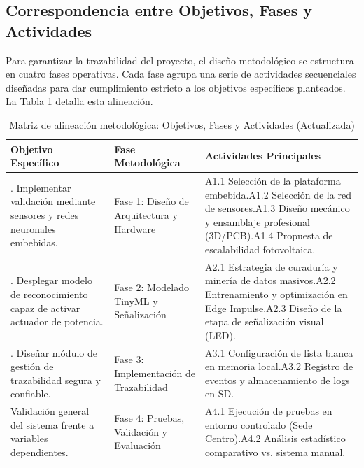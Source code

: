 \documentclass[12pt, letterpaper]{article}
\begin{document}
\subsection{Correspondencia entre Objetivos, Fases y Actividades}
Para garantizar la trazabilidad del proyecto, el diseño metodológico se estructura en cuatro fases operativas. Cada fase agrupa una serie de actividades secuenciales diseñadas para dar cumplimiento estricto a los objetivos específicos planteados. La Tabla \ref{tab:metodologia} detalla esta alineación.

\begin{table}[!ht]
\centering
\caption{Matriz de alineación metodológica: Objetivos, Fases y Actividades (Actualizada)}
\label{tab:metodologia}
\renewcommand{\arraystretch}{1.5}
\begin{tabularx}{\columnwidth}{>{\raggedright\arraybackslash}p{} >{\raggedright\arraybackslash}p{} X}
\toprule
\textbf{Objetivo Específico} & \textbf{Fase Metodológica} & \textbf{Actividades Principales} \\
\midrule
1. Implementar validación mediante sensores y redes neuronales embebidas. & Fase 1: Diseño de Arquitectura y Hardware & A1.1 Selección de la plataforma embebida.\newline A1.2 Selección de la red de sensores.\newline A1.3 Diseño mecánico y ensamblaje profesional (3D/PCB).\newline A1.4 Propuesta de escalabilidad fotovoltaica. \\
\midrule
2. Desplegar modelo de reconocimiento capaz de activar actuador de potencia. & Fase 2: Modelado TinyML y Señalización & A2.1 Estrategia de curaduría y minería de datos masivos.\newline A2.2 Entrenamiento y optimización en Edge Impulse.\newline A2.3 Diseño de la etapa de señalización visual (LED). \\
\midrule
3. Diseñar módulo de gestión de trazabilidad segura y confiable. & Fase 3: Implementación de Trazabilidad & A3.1 Configuración de lista blanca en memoria local.\newline A3.2 Registro de eventos y almacenamiento de logs en SD. \\
\midrule
Validación general del sistema frente a variables dependientes. & Fase 4: Pruebas, Validación y Evaluación & A4.1 Ejecución de pruebas en entorno controlado (Sede Centro).\newline A4.2 Análisis estadístico comparativo vs. sistema manual. \\
\bottomrule
\end{tabularx}
\end{table}
\end{document}

